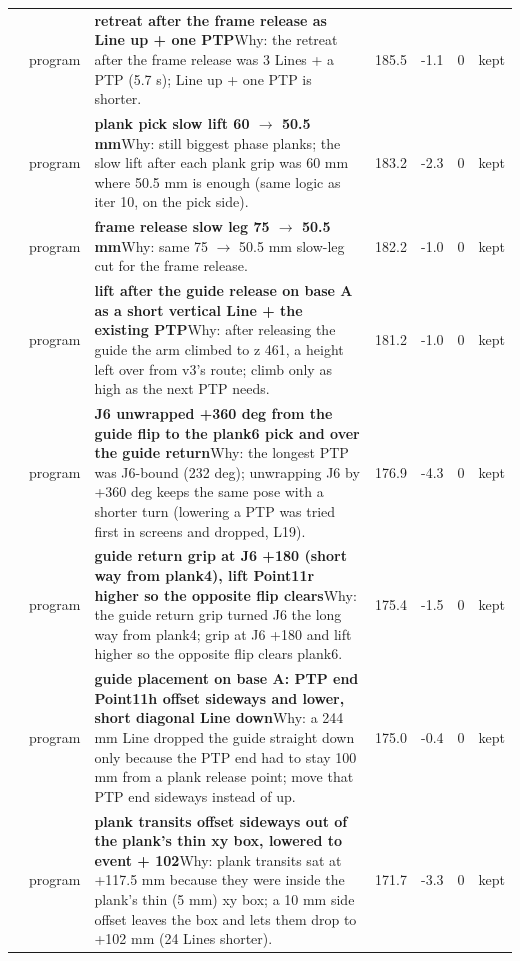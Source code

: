 {\begin{longtable}{>{\raggedleft}p{5mm} p{12mm} >{\raggedright}p{85mm} r r r p{14mm}}
15 & program & \textbf{retreat after the frame release as Line up + one PTP}\newline Why: the retreat after the frame release was 3 Lines + a PTP (5.7 s); Line up + one PTP is shorter. & 185.5 & -1.1 & 0 & kept \\
16 & program & \textbf{plank pick slow lift 60 $\to$ 50.5 mm}\newline Why: still biggest phase planks; the slow lift after each plank grip was 60 mm where 50.5 mm is enough (same logic as iter 10, on the pick side). & 183.2 & -2.3 & 0 & kept \\
17 & program & \textbf{frame release slow leg 75 $\to$ 50.5 mm}\newline Why: same 75 $\to$ 50.5 mm slow-leg cut for the frame release. & 182.2 & -1.0 & 0 & kept \\
18 & program & \textbf{lift after the guide release on base A as a short vertical Line + the existing PTP}\newline Why: after releasing the guide the arm climbed to z 461, a height left over from v3's route; climb only as high as the next PTP needs. & 181.2 & -1.0 & 0 & kept \\
19 & program & \textbf{J6 unwrapped +360 deg from the guide flip to the plank6 pick and over the guide return}\newline Why: the longest PTP was J6-bound (232 deg); unwrapping J6 by +360 deg keeps the same pose with a shorter turn (lowering a PTP was tried first in screens and dropped, L19). & 176.9 & -4.3 & 0 & kept \\
20 & program & \textbf{guide return grip at J6 +180 (short way from plank4), lift Point11r higher so the opposite flip clears}\newline Why: the guide return grip turned J6 the long way from plank4; grip at J6 +180 and lift higher so the opposite flip clears plank6. & 175.4 & -1.5 & 0 & kept \\
21 & program & \textbf{guide placement on base A: PTP end Point11h offset sideways and lower, short diagonal Line down}\newline Why: a 244 mm Line dropped the guide straight down only because the PTP end had to stay 100 mm from a plank release point; move that PTP end sideways instead of up. & 175.0 & -0.4 & 0 & kept \\
22 & program & \textbf{plank transits offset sideways out of the plank's thin xy box, lowered to event + 102}\newline Why: plank transits sat at +117.5 mm because they were inside the plank's thin (5 mm) xy box; a 10 mm side offset leaves the box and lets them drop to +102 mm (24 Lines shorter). & 171.7 & -3.3 & 0 & kept \\

\end{longtable}}
